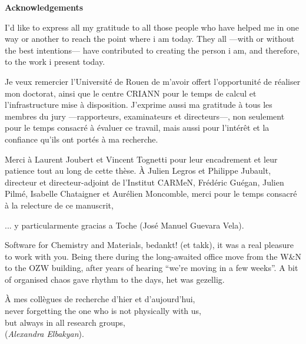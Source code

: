 %
%



\vspace*{1.0cm}
{\calligra\textbf{\Huge{Acknowledgements}}}
\vspace*{1.8cm}

{\setmainfont{QTChanceryType}\itshape{

  I'd like to express all my gratitude to all those people who have helped me in
  one way or another to reach the point where i am today. They all ---with or
  without the best intentions--- have contributed to creating the person i am,
  and therefore, to the work i present today.

  \vspace{5mm}%
  Je veux remercier l'Université de Rouen de m'avoir offert l'opportunité de
  réaliser mon doctorat, ainsi que le centre CRIANN pour le temps de calcul et
  l'infrastructure mise à disposition. J'exprime aussi ma gratitude à tous les
  membres du jury ---rapporteurs, examinateurs et directeurs---, non seulement
  pour le temps consacré à évaluer ce travail, mais aussi pour l'intérêt et la
  confiance qu'ils ont portés à ma recherche.

  \vspace{5mm}%
  Merci à Laurent Joubert et Vincent Tognetti pour leur encadrement et leur
  patience tout au long de cette thèse. À Julien Legros et Philippe Jubault,
  directeur et directeur-adjoint de l'Institut CARMeN, 
  Frédéric Guégan, Julien Pilmé, Isabelle Chataigner et Aurélien Moncomble, merci
  pour le temps consacré à la relecture de ce manuscrit,

  \noindent\hspace*{3.5\parindent} ... y particularmente gracias a Toche (José Manuel
  Guevara Vela).

  \vspace{5mm}%
  Software for Chemistry and Materials, bedankt! (et takk), it was a real
  pleasure to work with you.  Being there during the long-awaited office move
  from the W\&N to the OZW building, after years of hearing ``we're moving in a
  few weeks''.
  A bit of organised chaos
  gave rhythm to the days, het was gezellig.

  \vspace{5mm}%
  \noindent\hspace*{6\parindent}À mes collègues de recherche d'hier et d'aujourd'hui,\\
  \noindent\hfill never forgetting the one who is not physically with us,\\
  \noindent\hspace*{6\parindent}but always in all research groups,\\
  \noindent\hfill{} (\textit{Alexandra Elbakyan}).

}}

